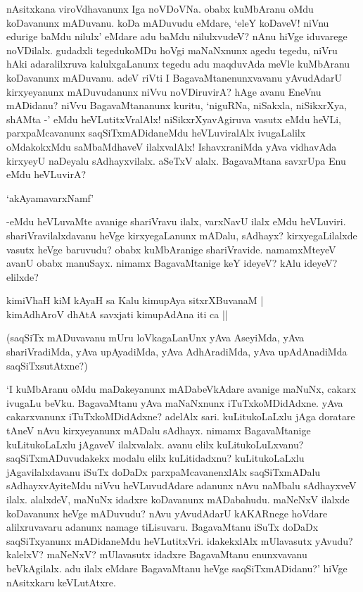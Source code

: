 nAsitxkana viroVdhavanunx Iga noVDoVNa. obabx kuMbAranu oMdu koDavanunx mADuvanu. koDa mADuvudu eMdare, `eleY koDaveV! niVnu edurige baMdu nilulx' eMdare adu baMdu nilulxvudeV? nAnu hiVge iduvarege noVDilalx. gudadxli tegedukoMDu hoVgi maNaNxnunx agedu tegedu, niVru hAki adaralilxruva kalulxgaLanunx tegedu adu maqduvAda meVle kuMbAranu koDavanunx mADuvanu. adeV riVti I BagavaMtanenunxvavanu yAvudAdarU kirxyeyanunx mADuvudanunx niVvu noVDiruvirA? hAge avanu EneVnu mADidanu? niVvu BagavaMtananunx kuritu, `niguRNa, niSakxla, niSikxrXya, shAMta -' eMdu heVLutitxVralAlx! niSikxrXyavAgiruva vasutx eMdu heVLi, parxpaMcavanunx saqSiTxmADidaneMdu heVLuviralAlx ivugaLalilx oMdakokxMdu saMbaMdhaveV ilalxvalAlx! IshavxraniMda yAva vidhavAda kirxyeyU naDeyalu sAdhayxvilalx. aSeTxV alalx. BagavaMtana savxrUpa Enu eMdu heVLuvirA?


\begin{shloka}
`akAyamavarxNamf'
\end{shloka}

-eMdu heVLuvaMte avanige shariVravu ilalx, varxNavU ilalx eMdu heVLuviri. shariVravilalxdavanu heVge kirxyegaLanunx mADalu, sAdhayx? kirxyegaLilalxde vasutx heVge baruvudu? obabx kuMbAranige shariVravide. namamxMteyeV avanU obabx manuSayx. nimamx BagavaMtanige keY ideyeV? kAlu ideyeV? elilxde?

\begin{shloka}
kimiVhaH kiM kAyaH sa Kalu kimupAya sitxrXBuvanaM |\\
kimAdhAroV dhAtA savxjati kimupAdAna iti ca ||
\end{shloka}

(saqSiTx mADuvavanu mUru loVkagaLanUnx yAva AseyiMda, yAva shariVradiMda, yAva upAyadiMda, yAva AdhAradiMda, yAva upAdAnadiMda saqSiTxsutAtxne?)

`I kuMbAranu oMdu maDakeyanunx mADabeVkAdare avanige maNuNx, cakarx ivugaLu beVku. BagavaMtanu yAva maNaNxnunx iTuTxkoMDidAdxne. yAva cakarxvanunx iTuTxkoMDidAdxne? adelAlx sari. kuLitukoLaLxlu jAga doratare tAneV nAvu kirxyeyanunx mADalu sAdhayx. nimamx BagavaMtanige kuLitukoLaLxlu jAgaveV ilalxvalalx. avanu elilx kuLitukoLuLxvanu? saqSiTxmADuvudakekx modalu elilx kuLitidadxnu? kuLitukoLaLxlu jAgavilalxdavanu iSuTx doDaDx parxpaMcavanenxlAlx saqSiTxmADalu sAdhayxvAyiteMdu niVvu heVLuvudAdare adanunx nAvu naMbalu sAdhayxveV ilalx. alalxdeV, maNuNx idadxre koDavanunx mADabahudu. maNeNxV ilalxde koDavanunx heVge mADuvudu? nAvu yAvudAdarU kAKARnege hoVdare alilxruvavaru adanunx namage tiLisuvaru. BagavaMtanu iSuTx doDaDx saqSiTxyanunx mADidaneMdu heVLutitxVri. idakekxlAlx mUlavasutx yAvudu? kalelxV? maNeNxV? mUlavasutx idadxre BagavaMtanu enunxvavanu beVkAgilalx. adu ilalx eMdare BagavaMtanu heVge saqSiTxmADidanu?' hiVge nAsitxkaru keVLutAtxre.

